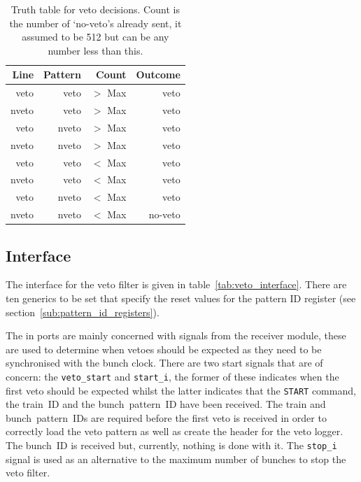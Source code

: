\begin{table}
  \begin{center}
    \begin{tabular}{r|r|r||r}
      Line  & Pattern &   Count   & Outcome \\
      \hline
      veto  &   veto  & \(>\) Max & veto    \\
      nveto &   veto  & \(>\) Max & veto    \\
      veto  &  nveto  & \(>\) Max & veto    \\
      nveto &  nveto  & \(>\) Max & veto    \\
      \hline
      veto  &   veto  & \(<\) Max & veto    \\
      nveto &   veto  & \(<\) Max & veto    \\
      veto  &  nveto  & \(<\) Max & veto    \\
      nveto &  nveto  & \(<\) Max & no-veto \\
            
    \end{tabular}
  \end{center}
  \caption{Truth table for veto decisions. Count is the number of `no-veto's already sent, it assumed to be 512 but can be any number less than this.}
  \label{tab:veto_truth_table}
\end{table}

\subsection{Interface} %
\label{sub:veto_interface}
The interface for the veto filter is given in table~\ref{tab:veto_interface}. There are ten generics to be set that specify the reset values for the pattern ID register (see section~\ref{sub:pattern_id_registers}).
    
The in ports are mainly concerned with signals from the receiver module, these are used to determine when vetoes should be expected as they need to be synchronised with the bunch clock. There are two start signals that are of concern: the \texttt{veto\_start} and \texttt{start\_i}, the former of these indicates when the first veto should be expected whilst the latter indicates that the \texttt{START} command, the train~ID and the bunch~pattern~ID have been received. The train and bunch~pattern~IDs are required before the first veto is received in order to correctly load the veto pattern as well as create the header for the veto logger. The bunch~ID is received but, currently, nothing is done with it. The \texttt{stop\_i} signal is used as an alternative to the maximum number of bunches to stop the veto filter.
    
